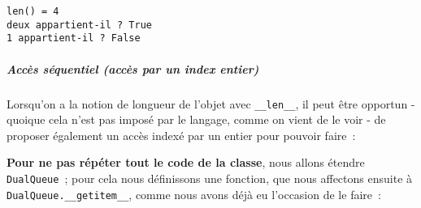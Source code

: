     \begin{Verbatim}[commandchars=\\\{\},frame=single,framerule=0.3mm,rulecolor=\color{cellframecolor}]
len() = 4
deux appartient-il ? True
1 appartient-il ? False
\end{Verbatim}

    \hypertarget{accuxe8s-suxe9quentiel-accuxe8s-par-un-index-entier}{%
\subparagraph{Accès séquentiel (accès par un index
entier)}\label{accuxe8s-suxe9quentiel-accuxe8s-par-un-index-entier}}

    Lorsqu'on a la notion de longueur de l'objet avec \texttt{\_\_len\_\_},
il peut être opportun - quoique cela n'est pas imposé par le langage,
comme on vient de le voir - de proposer également un accès indexé par un
entier pour pouvoir faire~:

\begin{Shaded}
\begin{Highlighting}[frame=lines,framerule=0.6mm,rulecolor=\color{asisframecolor}]
\NormalTok{queue[}\NormalTok{]}
\end{Highlighting}
\end{Shaded}

\textbf{Pour ne pas répéter tout le code de la classe}, nous allons
étendre \texttt{DualQueue}~; pour cela nous définissons une fonction,
que nous affectons ensuite à \texttt{DualQueue.\_\_getitem\_\_}, comme
nous avons déjà eu l'occasion de le faire~:

